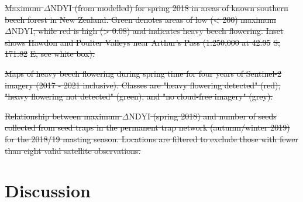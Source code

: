 \documentclass[remotesensing,article,submit,moreauthors,pdftex]{Definitions/mdpi}
\providecommand{\DIFdel}[1]{{\protect\color{red}\sout{#1}}}                      %
\providecommand{\DIFdelbegin}{} %
\providecommand{\DIFdelend}{} %
\providecommand{\DIFdelFL}[1]{\DIFdel{#1}} %
\begin{document}
\DIFdelbegin %
{%
\DIFdelFL{Maximum $\Delta\text{NDYI}$ (from modelled) for spring 2018 in areas of known southern beech
    forest in New Zealand. Green denotes areas of low (< 200) maximum $\Delta\text{NDYI}$, while red is high (> 0.08) and indicates heavy beech flowering. Inset shows Hawdon and Poulter Valleys near Arthur's Pass (1:250,000 at 42.95}%
\DIFdelFL{S, 171.82}%
\DIFdelFL{E, see white box).}}

{%
\DIFdelFL{Maps of heavy beech flowering during spring time for four years of Sentinel-2 imagery (2017 - 2021 inclusive). Classes are "heavy flowering detected" (red), "heavy flowering not detected" (green), and "no cloud-free imagery" (grey).}}

{%
\DIFdelFL{Relationship between maximum $\Delta\text{NDYI}$ (spring 2018) and number of seeds collected from seed traps in the permanent trap network (autumn/winter 2019) for the 2018/19 masting season. Locations are filtered to exclude those with fewer than eight valid satellite observations.}}

\DIFdelend %

\section{Discussion}
\end{document}
